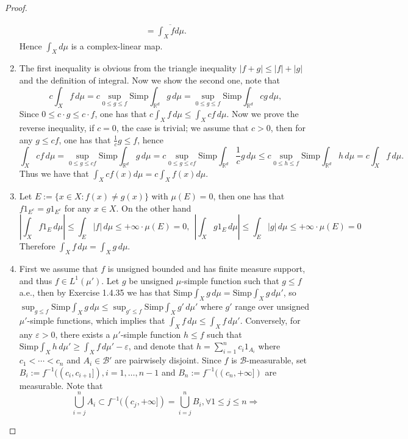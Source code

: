 \documentclass[a4paper]{article}
\begin{document}
\begin{proof}
\begin{enumerate}[label = (\roman*)]
\begin{align*}
        = \overline{\int_{X} f d\mu}.
    \end{align*}
    Hence $\int_X d\mu$ is a complex-linear map.
    \item The first inequality is obvious from the triangle inequality $|f + g| \leq |f| + |g|$ and the definition 
    of integral. Now we show the second one, 
    note that $$
c\int_Xf\,d\mu = c\sup_{0 \leq g \leq f} \mathrm{Simp}\int_{\mathbb{R}^d} g \,d\mu
= \sup_{0 \leq g \leq f} \mathrm{Simp}\int_{\mathbb{R}^d} cg\,d\mu,
$$Since $0 \leq c\cdot g \leq c\cdot f$, one has that $c\int_X f\,d\mu \leq 
\int_X cf\,d\mu$. Now we prove the reverse inequality, if $c = 0$, the case is trivial;
we assume that $c > 0$, then for any $g \leq cf$, one has that $\frac{1}{c}g \leq f$, hence $$
\int_X cf\,d\mu = \sup_{0 \leq g \leq cf} \mathrm{Simp}\int_{\mathbb{R}^d}g\,d\mu
= c \sup_{0 \leq g \leq cf} \mathrm{Simp}\int_{\mathbb{R}^d} \frac{1}{c} g\,d\mu \leq
c \sup_{0 \leq h \leq f} \mathrm{Simp}\int_{\mathbb{R}^d} h\,d\mu = c\int_X f\,d\mu.
$$
Thus we have that $\int_X cf(x)d\mu = c\int_X f(x)d\mu$.
    \item Let $E := \{x \in X : f(x) \ne g(x)\}$ with $\mu(E) = 0$, then one has that $f1_{E^c} = g1_{E^c}$ for any 
    $x \in X$. On the other hand $$
    |\int_X f1_E\,d\mu| \leq \int_E |f|\,d\mu \leq +\infty \cdot \mu(E) = 0,\ \  
    |\int_X g1_E\,d\mu| \leq \int_E |g|\,d\mu \leq +\infty \cdot \mu(E) = 0
    $$Therefore $\int_X f\,d\mu = \int_X g\,d\mu$.
    \item First we assume that $f$ is unsigned bounded and has finite measure support, and thus $f \in L^1(\mu')$.
    Let $g$ be unsigned $\mu$-simple
    function such that $g \leq f$ a.e., then by Exercise 1.4.35 we has that $\mathrm{Simp}\int_X g\,d\mu = \mathrm{Simp}\int_X g\,d\mu'$,
    so $\sup_{g \leq f}\mathrm{Simp}\int_X g\,d\mu \leq \sup_{g' \leq f}\mathrm{Simp}\int_X g'\,d\mu'$ where $g'$
    range over unsigned $\mu'$-simple functions, which implies that $\int_X f\,d\mu \leq \int_X f\,d\mu'$. Conversely,
    for any $\varepsilon > 0$, there exists a $\mu'$-simple function $h \leq f$ such that 
    $\mathrm{Simp}\int_X h\,d\mu' \geq \int_X f\,d\mu' - \varepsilon$, and denote that $h = \sum_{i = 1}^n c_i1_{A_i}$
    where $c_1 < \cdots < c_n$ and $A_i \in \mathcal{B}'$ are pairwisely disjoint. Since $f$ is $\mathcal{B}$-measurable,
    set $B_i := f^{-1}((c_i, c_{i + 1}]), i = 1, \dots, n - 1$ and $B_n := f^{-1}((c_n, +\infty])$ are measurable.
    Note that $$
    \bigcup_{i = j}^n A_i \subset f^{-1}((c_j, +\infty]) = \bigcup_{i = j}^nB_i, \forall 1 \leq j \leq n \Rightarrow
$$
\end{enumerate}
\end{proof}
\end{document}
